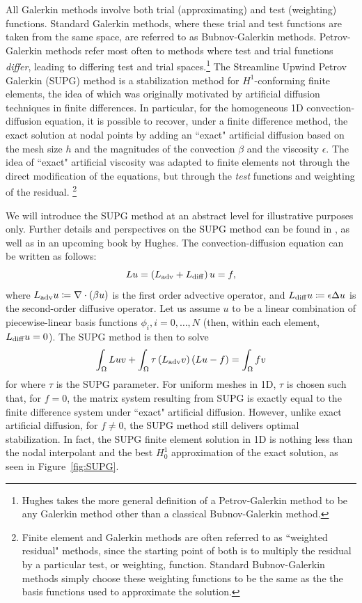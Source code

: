All Galerkin methods involve both trial (approximating) and test (weighting) functions.   Standard Galerkin methods, where these trial and test functions are taken from the same space, are referred to as Bubnov-Galerkin methods.  Petrov-Galerkin methods refer most often to methods where test and trial functions \emph{differ}, leading to differing test and trial spaces.\footnote{Hughes takes the more general definition of a Petrov-Galerkin method to be any Galerkin method other than a classical Bubnov-Galerkin method.}  The Streamline Upwind Petrov Galerkin (SUPG) method is a stabilization method for $H^1$-conforming finite elements, the idea of which was originally motivated by artificial diffusion techniques in finite differences.  In particular, for the homogeneous 1D convection-diffusion equation, it is possible to recover, under a finite difference method, the exact solution at nodal points by adding an ``exact" artificial diffusion based on the mesh size $h$ and the magnitudes of the convection $\beta$ and the viscosity $\epsilon$.  The idea of ``exact" artificial viscosity was adapted to finite elements not through the direct modification of the equations, but through the \emph{test} functions and weighting of the residual. \footnote{Finite element and Galerkin methods are often referred to as ``weighted residual" methods, since the starting point of both is to multiply the residual by a particular test, or weighting, function.  Standard Bubnov-Galerkin methods simply choose these weighting functions to be the same as the the basis functions used to approximate the solution.  }

We will introduce the SUPG method at an abstract level for illustrative purposes only.  Further details and perspectives on the SUPG method can be found in \cite{SUPG}, as well as in an upcoming book by Hughes.  The convection-diffusion equation can be written as follows:
\[
Lu = \left(L_{\rm adv} + L_{\rm diff} \right) u = f,
\]
where $L_{\rm adv}u \coloneqq \div \left(\beta u\right)$ is the first order advective operator, and $L_{\rm diff}u \coloneqq \epsilon \Delta u$ is the second-order diffusive operator.  Let us assume $u$ to be a linear combination of piecewise-linear basis functions $\phi_i, i = 0,\ldots,N$ (then, within each element, $L_{\rm diff} u = 0$).  The SUPG method is then to solve
\[
\int_\Omega L u v + \int_\Omega \tau \left(L_{\rm adv}v\right)\left( L u - f\right) = \int_\Omega f v 
\]
for where $\tau$ is the SUPG parameter.  For uniform meshes in 1D, $\tau$ is chosen such that, for $f=0$, the matrix system resulting from SUPG is exactly equal to the finite difference system under ``exact" artificial diffusion.  However, unlike exact artificial diffusion, for $f\neq 0$, the SUPG method still delivers optimal stabilization.  In fact, the SUPG finite element solution in 1D is nothing less than the nodal interpolant and the best $H^1_0$ approximation of the exact solution, as seen in Figure~\ref{fig:SUPG}.

